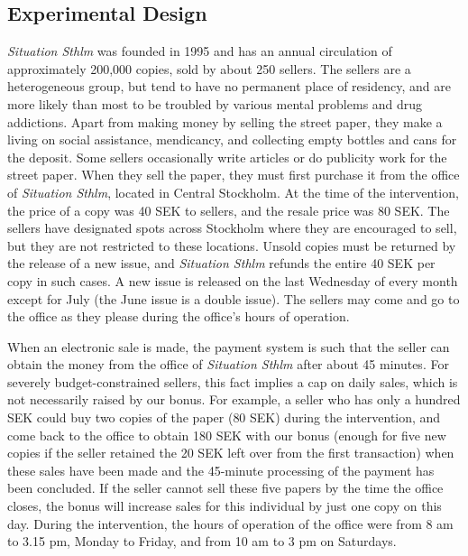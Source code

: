 \documentclass[12pt]{article}
\begin{document}
\subsection{Experimental Design}
\textit{Situation Sthlm} was founded in 1995 and has an annual circulation of approximately 200,000 copies, sold by about 250 sellers. The sellers are a heterogeneous group, but tend to have no permanent place of residency, and are more likely than most to be troubled by various mental problems and drug addictions. Apart from making money by selling the street paper, they make a living on social assistance, mendicancy, and collecting empty bottles and cans for the deposit. Some sellers occasionally write articles or do publicity work for the street paper. When they sell the paper, they must first purchase it from the office of \textit{Situation Sthlm}, located in Central Stockholm. At the time of the intervention, the price of a copy was 40 SEK to sellers, and the resale price was 80 SEK. The sellers have designated spots across Stockholm where they are encouraged to sell, but they are not restricted to these locations. Unsold copies must be returned by the release of a new issue, and \textit{Situation Sthlm} refunds the entire 40 SEK per copy in such cases. A new issue is released on the last Wednesday of every month except for July (the June issue is a double issue). The sellers may come and go to the office as they please during the office’s hours of operation.

When an electronic sale is made, the payment system is such that the seller can obtain the money from the office of \textit{Situation Sthlm} after about 45 minutes. For severely budget-constrained sellers, this fact implies a cap on daily sales, which is not necessarily raised by our bonus. For example, a seller who has only a hundred SEK could buy two copies of the paper (80 SEK) during the intervention, and come back to the office to obtain 180 SEK with our bonus (enough for five new copies if the seller retained the 20 SEK left over from the first transaction) when these sales have been made and the 45-minute processing of the payment has been concluded. If the seller cannot sell these five papers by the time the office closes, the bonus will increase sales for this individual by just one copy on this day. During the intervention, the hours of operation of the office were from 8 am to 3.15 pm, Monday to Friday, and from 10 am to 3 pm on Saturdays.
\end{document}
